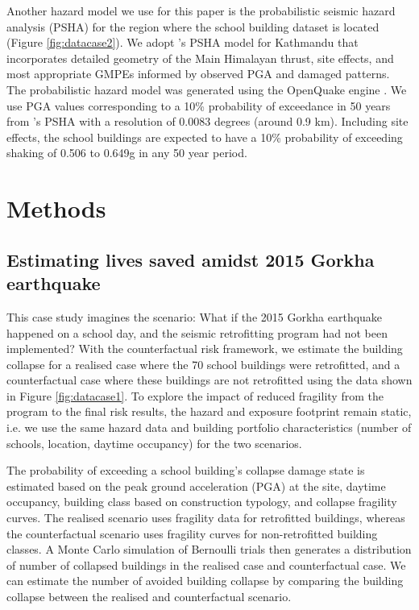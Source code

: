 \documentclass[utf8]{frontiersSCNS} %
\begin{document}
Another hazard model we use for this paper is the probabilistic seismic hazard analysis (PSHA) for the region where the school building dataset is located (Figure \ref{fig:datacase2}). We adopt \cite{stevens2018probabilistic}'s PSHA model for Kathmandu that incorporates detailed geometry of the Main Himalayan thrust, site effects, and most appropriate GMPEs informed by observed PGA and damaged patterns. The probabilistic hazard model was generated using the OpenQuake engine \citep{pagani2014openquake, silva2014development}. We use PGA values corresponding to a 10\% probability of exceedance in 50 years from \cite{stevens2018probabilistic}'s PSHA with a resolution of 0.0083 degrees (around 0.9 km). Including site effects, the school buildings are expected to have a 10\% probability of exceeding shaking of 0.506 to 0.649g in any 50 year period. 

\section{Methods}
\label{section-methods}

\subsection{Estimating lives saved amidst 2015 Gorkha earthquake}
\label{section-case1}

This case study imagines the scenario: What if the 2015 Gorkha earthquake happened on a school day, and the seismic retrofitting program had not been implemented? With the counterfactual risk framework, we estimate the building collapse for a realised case where the 70 school buildings were retrofitted, and a counterfactual case where these buildings are not retrofitted using the data shown in Figure \ref{fig:datacase1}. To explore the impact of reduced fragility from the program to the final risk results, the hazard and exposure footprint remain static, i.e. we use the same hazard data and building portfolio characteristics (number of schools, location, daytime occupancy) for the two scenarios.

The probability of exceeding a school building's collapse damage state is estimated based on the peak ground acceleration (PGA) at the site, daytime occupancy, building class based on construction typology, and collapse fragility curves. The realised scenario uses fragility data for retrofitted buildings, whereas the counterfactual scenario uses fragility curves for non-retrofitted building classes. A Monte Carlo simulation of Bernoulli trials then generates a distribution of number of collapsed buildings in the realised case and counterfactual case. We can estimate the number of avoided building collapse by comparing the building collapse between the realised and counterfactual scenario. 
\end{document}
